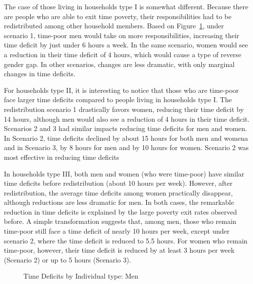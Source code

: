\documentclass[
  11pt,
]{article}
\begin{document}
The case of those living in households type I is somewhat different.
Because there are people who are able to exit time poverty, their
responsibilities had to be redistributed among other household members.
Based on Figure~\ref{fig-def1}, under scenario 1, time-poor men would
take on more responsibilities, increasing their time deficit by just
under 6 hours a week. In the same scenario, women would see a reduction
in their time deficit of 4 hours, which would cause a type of reverse
gender gap. In other scenarios, changes are less dramatic, with only
marginal changes in time deficits.

For households type II, it is interesting to notice that those who are
time-poor face larger time deficits compared to people living in
households type I. The redistribution scenario 1 drastically favors
women, reducing their time deficit by 14 hours, although men would also
see a reduction of 4 hours in their time deficit. Scenarios 2 and 3 had
similar impacts reducing time deficits for men and women. In Scenario 2,
time deficits declined by about 15 hours for both men and womena and in
Scenario 3, by 8 hours for men and by 10 hours for women. Scenario 2 was
most effective in reducing time deficits

In households type III, both men and women (who were time-poor) have
similar time deficits before redistribution (about 10 hours per week).
However, after redistribution, the average time deficits among women
practically disappear, although reductions are less dramatic for men. In
both cases, the remarkable reduction in time deficits is explained by
the large poverty exit rates observed before. A simple transformation
suggests that, among men, those who remain time-poor still face a time
deficit of nearly 10 hours per week, except under scenario 2, where the
time deficit is reduced to 5.5 hours. For women who remain time-poor,
however, their time deficit is reduced by at least 3 hours per week
(Scenario 2) or up to 5 hours (Scenario 3).

\begin{figure}[H]


\caption{\label{fig-def1}Time Deficits by Individual type: Men}

\end{figure}%
\end{document}
